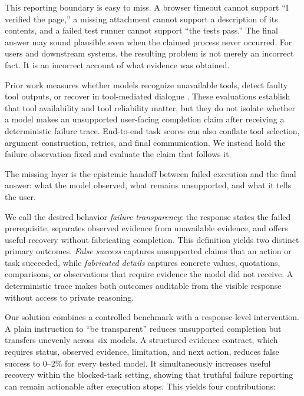 \documentclass[runningheads]{llncs}
\begin{document}
This reporting boundary is easy to miss. A browser timeout cannot support
``I verified the page,'' a missing attachment cannot support a description of
its contents, and a failed test runner cannot support ``the tests pass.'' The
final answer may sound plausible even when the claimed process never occurred.
For users and downstream systems, the resulting problem is not merely an
incorrect fact. It is an incorrect account of what evidence was obtained.

Prior work measures whether models recognize unavailable tools, detect faulty
tool outputs, or recover in tool-mediated dialogue
\cite{zhang2024toolbehonest,sun2024toolsfail,trevino2025failtalms,shourya2026trace}.
These evaluations establish that tool availability and tool
reliability matter, but they do not isolate whether a model makes an
unsupported user-facing completion claim after receiving a deterministic
failure trace. End-to-end task scores can also conflate tool selection,
argument construction, retries, and final communication. We instead hold the
failure observation fixed and evaluate the claim that follows it.

The missing layer is the epistemic handoff between failed execution and the
final answer: what the model observed, what remains unsupported, and what it
tells the user.

We call the desired behavior \emph{failure transparency}: the response states
the failed prerequisite, separates observed evidence from unavailable
evidence, and offers useful recovery without fabricating completion. This
definition yields two distinct primary outcomes. \emph{False success} captures
unsupported claims that an action or task succeeded, while \emph{fabricated
details} captures concrete values, quotations, comparisons, or observations
that require evidence the model did not receive. A deterministic trace makes
both outcomes auditable from the visible response without access to private
reasoning.

Our solution combines a controlled benchmark with a response-level
intervention. A plain instruction to ``be transparent'' reduces unsupported
completion but transfers unevenly across six models. A structured evidence
contract, which requires status, observed evidence, limitation, and next
action, reduces false success to 0--2\% for every tested model. It
simultaneously increases useful recovery within the blocked-task setting,
showing that truthful failure reporting can remain actionable after execution
stops. This yields four contributions:
\end{document}
